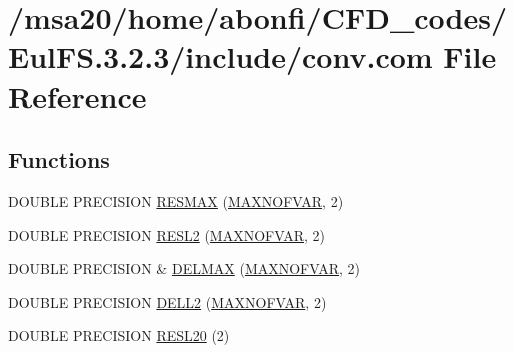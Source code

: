 \hypertarget{msa20_2home_2abonfi_2_c_f_d__codes_2_eul_f_s_83_82_83_2include_2conv_8com}{\section{/msa20/home/abonfi/\-C\-F\-D\-\_\-codes/\-Eul\-F\-S.3.2.3/include/conv.com File Reference}
\label{msa20_2home_2abonfi_2_c_f_d__codes_2_eul_f_s_83_82_83_2include_2conv_8com}
}
\subsection*{Functions}
\begin{DoxyCompactItemize}
\item 
D\-O\-U\-B\-L\-E P\-R\-E\-C\-I\-S\-I\-O\-N \hyperlink{msa20_2home_2abonfi_2_c_f_d__codes_2_eul_f_s_83_82_83_2include_2conv_8com_adf31d6b2d57a615da367e41276e2c368}{R\-E\-S\-M\-A\-X} (\hyperlink{msa20_2home_2abonfi_2_c_f_d__codes_2_eul_f_s_83_82_83_2include_2paramt_8h_ae08fa28f58a75033834af08d1f9359ce}{M\-A\-X\-N\-O\-F\-V\-A\-R}, 2)
\item 
D\-O\-U\-B\-L\-E P\-R\-E\-C\-I\-S\-I\-O\-N \hyperlink{msa20_2home_2abonfi_2_c_f_d__codes_2_eul_f_s_83_82_83_2include_2conv_8com_a035fe6706d7b732830ffafb620f8a07b}{R\-E\-S\-L2} (\hyperlink{msa20_2home_2abonfi_2_c_f_d__codes_2_eul_f_s_83_82_83_2include_2paramt_8h_ae08fa28f58a75033834af08d1f9359ce}{M\-A\-X\-N\-O\-F\-V\-A\-R}, 2)
\item 
D\-O\-U\-B\-L\-E P\-R\-E\-C\-I\-S\-I\-O\-N \& \hyperlink{msa20_2home_2abonfi_2_c_f_d__codes_2_eul_f_s_83_82_83_2include_2conv_8com_aa36704749632fb4cb4f4b32adae95af0}{D\-E\-L\-M\-A\-X} (\hyperlink{msa20_2home_2abonfi_2_c_f_d__codes_2_eul_f_s_83_82_83_2include_2paramt_8h_ae08fa28f58a75033834af08d1f9359ce}{M\-A\-X\-N\-O\-F\-V\-A\-R}, 2)
\item 
D\-O\-U\-B\-L\-E P\-R\-E\-C\-I\-S\-I\-O\-N \hyperlink{msa20_2home_2abonfi_2_c_f_d__codes_2_eul_f_s_83_82_83_2include_2conv_8com_ad097628ad79bd4f6f53ba564741f0fc8}{D\-E\-L\-L2} (\hyperlink{msa20_2home_2abonfi_2_c_f_d__codes_2_eul_f_s_83_82_83_2include_2paramt_8h_ae08fa28f58a75033834af08d1f9359ce}{M\-A\-X\-N\-O\-F\-V\-A\-R}, 2)
\item 
D\-O\-U\-B\-L\-E P\-R\-E\-C\-I\-S\-I\-O\-N \hyperlink{msa20_2home_2abonfi_2_c_f_d__codes_2_eul_f_s_83_82_83_2include_2conv_8com_a6cae5dab4b3be52cf1bc44b46eb1d76a}{R\-E\-S\-L20} (2)
\item 

\end{DoxyCompactItemize}
